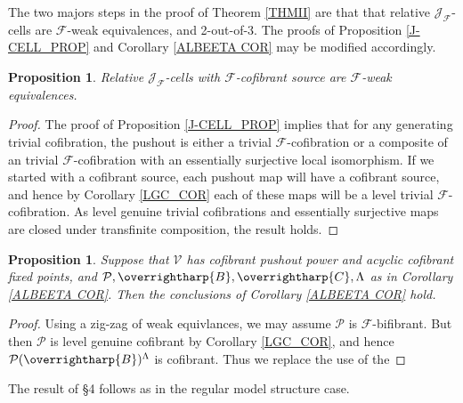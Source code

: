 \documentclass[a4paper,10pt
,draft
]{article}%
\numberwithin{equation}{section}
\numberwithin{figure}{section}
\newtheorem{proposition}[equation]{Proposition}%
\theoremstyle{definition} %
\newcommand{\vect}[1]{\text{\overrightharp{\ensuremath{#1}}}}
\newcommand{\F}{\ensuremath{\mathcal F}}
\newcommand{\V}{\ensuremath{\mathcal V}}
\renewcommand{\P}{\ensuremath{\mathcal P}}
\newcommand{\1}{\ensuremath{\mathbbm 1}}%
\begin{document}
The two majors steps in the proof of Theorem \ref{THMII} are that that relative $\mathcal J_\F$-cells are $\F$-weak equivalences, and 2-out-of-3.
The proofs of Proposition \ref{J-CELL_PROP} and Corollary \ref{ALBEETA COR} may be modified accordingly.

\begin{proposition}
      Relative $\mathcal J_\F$-cells with $\F$-cofibrant source are $\F$-weak equivalences.
\end{proposition}
\begin{proof}
      The proof of Proposition \ref{J-CELL_PROP} implies that for any generating trivial cofibration,
      the pushout is either a trivial $\F$-cofibration or a composite of an trivial $\F$-cofibration with an essentially surjective local isomorphism.
      If we started with a cofibrant source, each pushout map will have a cofibrant source,
      and hence by Corollary \ref{LGC_COR} each of these maps will be a level trivial $\F$-cofibration.
      As level genuine trivial cofibrations and essentially surjective maps are closed under transfinite composition, the result holds.
\end{proof}

\begin{proposition}
      Suppose that $\V$ has cofibrant pushout power and acyclic cofibrant fixed points,
      and $\P, \vect B, \vect C, \Lambda$ as in Corollary \ref{ALBEETA COR}.
      Then the conclusions of Corollary \ref{ALBEETA COR} hold.
\end{proposition}
\begin{proof}
      Using a zig-zag of weak equivlances, we may assume $\P$ is $\F$-bifibrant.
      But then $\P$ is level genuine cofibrant by Corollary \ref{LGC_COR},
      and hence $\P(\vect B)^\Lambda$ is cofibrant.
      Thus we replace the use of the 
\end{proof}

The result of \S 4 follows as in the regular model structure case.
\end{document}
